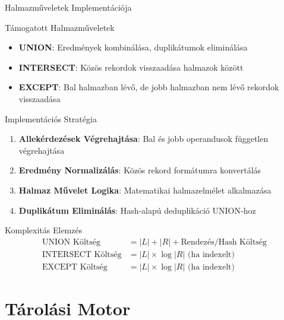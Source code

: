 \documentclass[aspectratio=169]{beamer}
\begin{document}
\begin{frame}{Halmazműveletek Implementációja}
\begin{block}{Támogatott Halmazműveletek}
\begin{itemize}
    \item \textbf{UNION}: Eredmények kombinálása, duplikátumok eliminálása
    \item \textbf{INTERSECT}: Közös rekordok visszaadása halmazok között
    \item \textbf{EXCEPT}: Bal halmazban lévő, de jobb halmazban nem lévő rekordok visszaadása
\end{itemize}
\end{block}

\begin{block}{Implementációs Stratégia}
\begin{enumerate}
    \item \textbf{Allekérdezések Végrehajtása}: Bal és jobb operandusok független végrehajtása
    \item \textbf{Eredmény Normalizálás}: Közös rekord formátumra konvertálás
    \item \textbf{Halmaz Művelet Logika}: Matematikai halmazelmélet alkalmazása
    \item \textbf{Duplikátum Eliminálás}: Hash-alapú deduplikáció UNION-hoz
\end{enumerate}
\end{block}

\begin{block}{Komplexitás Elemzés}
\begin{align}
\text{UNION Költség} &= |L| + |R| + \text{Rendezés/Hash Költség} \\
\text{INTERSECT Költség} &= |L| \times \log|R| \text{ (ha indexelt)} \\
\text{EXCEPT Költség} &= |L| \times \log|R| \text{ (ha indexelt)}
\end{align}
\end{block}
\end{frame}

\section{Tárolási Motor}
\end{document}
